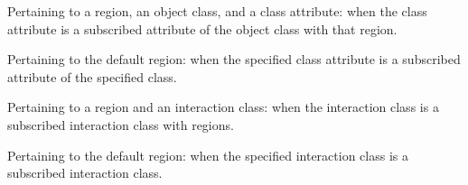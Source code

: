 \begin{hlalist}
    \item Pertaining to a region, an object class, and a class attribute: when the class attribute is a subscribed attribute of the object class with that region. 
    \vspace{6.5pt}
    \vspace{4pt}
    \item Pertaining to the default region: when the specified class attribute is a subscribed attribute of the specified class. 
    \vspace{6.5pt}
\end{hlalist}
\vspace{-4pt}

\begin{hlalist}
    \item Pertaining to a region and an interaction class: when the interaction class is a subscribed interaction class with regions. 
    \vspace{6.5pt}
    \vspace{4pt}
    \item Pertaining to the default region: when the specified interaction class is a subscribed interaction class. 
    \vspace{6.5pt}
\end{hlalist}
\vspace{-4pt}

